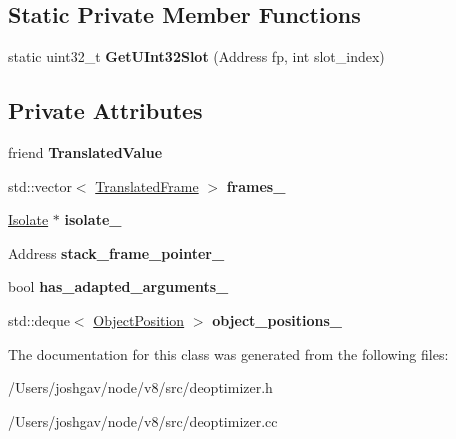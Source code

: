 \subsection*{Static Private Member Functions}
\begin{DoxyCompactItemize}
\item 
static uint32\+\_\+t {\bfseries Get\+U\+Int32\+Slot} (Address fp, int slot\+\_\+index)\hypertarget{classv8_1_1internal_1_1_translated_state_afc3d5af27ac0df68a372578e0893c720}{}\label{classv8_1_1internal_1_1_translated_state_afc3d5af27ac0df68a372578e0893c720}

\end{DoxyCompactItemize}
\subsection*{Private Attributes}
\begin{DoxyCompactItemize}
\item 
friend {\bfseries Translated\+Value}\hypertarget{classv8_1_1internal_1_1_translated_state_a59c0b1c47a40379a0d4d601cad7988bb}{}\label{classv8_1_1internal_1_1_translated_state_a59c0b1c47a40379a0d4d601cad7988bb}

\item 
std\+::vector$<$ \hyperlink{classv8_1_1internal_1_1_translated_frame}{Translated\+Frame} $>$ {\bfseries frames\+\_\+}\hypertarget{classv8_1_1internal_1_1_translated_state_ac2def08acb3146d147e6a497ccc83ad6}{}\label{classv8_1_1internal_1_1_translated_state_ac2def08acb3146d147e6a497ccc83ad6}

\item 
\hyperlink{classv8_1_1internal_1_1_isolate}{Isolate} $\ast$ {\bfseries isolate\+\_\+}\hypertarget{classv8_1_1internal_1_1_translated_state_a4444d2aefbbca9d54645cf1eb652346b}{}\label{classv8_1_1internal_1_1_translated_state_a4444d2aefbbca9d54645cf1eb652346b}

\item 
Address {\bfseries stack\+\_\+frame\+\_\+pointer\+\_\+}\hypertarget{classv8_1_1internal_1_1_translated_state_a0c371509599011773e34a598e2a6d904}{}\label{classv8_1_1internal_1_1_translated_state_a0c371509599011773e34a598e2a6d904}

\item 
bool {\bfseries has\+\_\+adapted\+\_\+arguments\+\_\+}\hypertarget{classv8_1_1internal_1_1_translated_state_abc1f5c693f5aca67bf1896190be868b6}{}\label{classv8_1_1internal_1_1_translated_state_abc1f5c693f5aca67bf1896190be868b6}

\item 
std\+::deque$<$ \hyperlink{structv8_1_1internal_1_1_translated_state_1_1_object_position}{Object\+Position} $>$ {\bfseries object\+\_\+positions\+\_\+}\hypertarget{classv8_1_1internal_1_1_translated_state_a843e4656c1cb19be990f5b574a232964}{}\label{classv8_1_1internal_1_1_translated_state_a843e4656c1cb19be990f5b574a232964}

\end{DoxyCompactItemize}


The documentation for this class was generated from the following files\+:\begin{DoxyCompactItemize}
\item 
/\+Users/joshgav/node/v8/src/deoptimizer.\+h\item 
/\+Users/joshgav/node/v8/src/deoptimizer.\+cc\end{DoxyCompactItemize}
